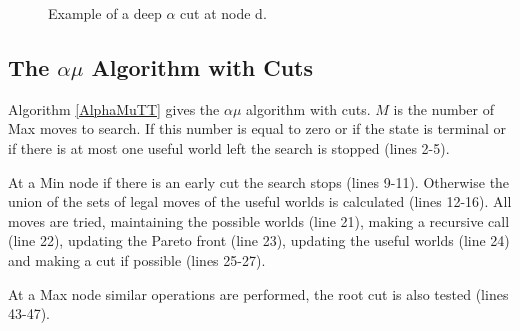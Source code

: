 \documentclass[letterpaper]{article} %
\begin{document}
\begin{figure}
  \centering
  \caption{Example of a deep $\alpha$ cut at node d.}
  \label{figureDeepAlphaCut}
\end{figure}



\subsection{The $\alpha\mu$ Algorithm with Cuts}

Algorithm \ref{AlphaMuTT} gives the $\alpha\mu$ algorithm with cuts. $M$ is the number of Max moves to search. If this number is equal to zero or if the state is terminal or if there is at most one useful world left the search is stopped (lines 2-5).

At a Min node if there is an early cut the search stops (lines 9-11). Otherwise the union of the sets of legal moves of the useful worlds is calculated (lines 12-16). All moves are tried, maintaining the possible worlds (line 21), making a recursive call (line 22), updating the Pareto front (line 23), updating the useful worlds (line 24) and making a cut if possible (lines 25-27).

At a Max node similar operations are performed, the root cut is also tested (lines 43-47).
\end{document}
